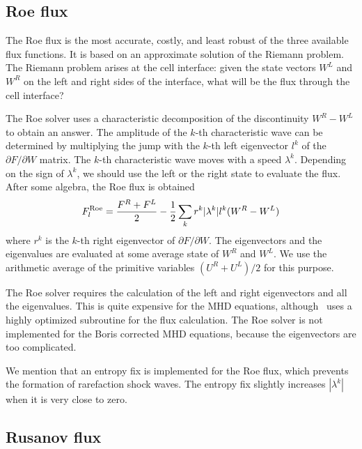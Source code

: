 \subsection{Roe flux \label{section:roe}}

The Roe flux is the most accurate, costly, and least robust of the three
available flux functions. It is based on an approximate solution of
the Riemann problem. The Riemann problem arises at the cell interface:
given the state vectors $W^L$ and $W^R$ on the left and right sides
of the interface, what will be the flux through the cell interface?

The Roe solver uses a characteristic decomposition of the discontinuity
$W^R-W^L$ to obtain an answer. The amplitude of the $k$-th characteristic wave
can be determined by multiplying the jump with the $k$-th left eigenvector
$l^k$ of the $\partial F/\partial W$ matrix. The $k$-th characteristic
wave moves with a speed $\lambda^k$. Depending on the sign of $\lambda^k$,
we should use the left or the right state to evaluate the flux.
After some algebra, the Roe flux is obtained
\begin{equation}
   F^{\rm Roe}_l = 
      \frac{F^R+F^L}{2} - \frac12 \sum_k r^k |\lambda^k| l^k (W^R-W^L)
\label{q-roe}
\end{equation}
where $r^k$ is the $k$-th right eigenvector of $\partial F/\partial W$. 
The eigenvectors and the eigenvalues are evaluated at some average state 
of $W^R$ and $W^L$.
We use the arithmetic average of the primitive variables $(U^R+U^L)/2$
for this purpose.

The Roe solver requires the calculation of the left and right eigenvectors 
and all the eigenvalues.
This is quite expensive for the MHD equations, although \BATSRUS\ uses a 
highly optimized subroutine for the flux calculation. The Roe solver is
not implemented for the Boris corrected MHD equations, because the eigenvectors
are too complicated. 

We mention that an entropy fix is implemented for the Roe flux, which
prevents the formation of rarefaction shock waves. The entropy fix
slightly increases $|\lambda^k|$ when it is very close to zero.

\subsection{Rusanov flux \label{section:rusanov}}

